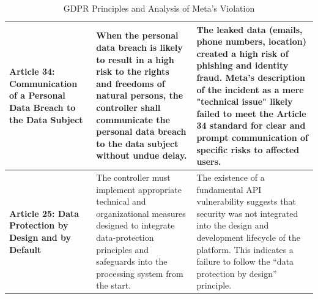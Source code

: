 \documentclass{article}
\begin{document}
\begin{table}[H]
\begin{tabularx}{\textwidth}{|p{2.5cm}|X|X|}
\textbf{Article 34: Communication of a Personal Data Breach to the Data Subject} 
& When the personal data breach is likely to result in a high risk to the rights and freedoms of natural persons, the controller shall communicate the personal data breach to the data subject without undue delay.
& The leaked data (emails, phone numbers, location) created a high risk of phishing and identity fraud. Meta's description of the incident as a mere "technical issue" likely failed to meet the Article 34 standard for clear and prompt communication of specific risks to affected users. \\
\hline

\textbf{Article 25: Data Protection by Design and by Default} 
& The controller must implement appropriate technical and organizational measures designed to integrate data-protection principles and safeguards into the processing system from the start. 
& The existence of a fundamental API vulnerability suggests that security was not integrated into the design and development lifecycle of the platform. This indicates a failure to follow the ``data protection by design'' principle. \\
\hline

\end{tabularx}
\caption{GDPR Principles and Analysis of Meta's Violation}
\end{table}
\end{document}

